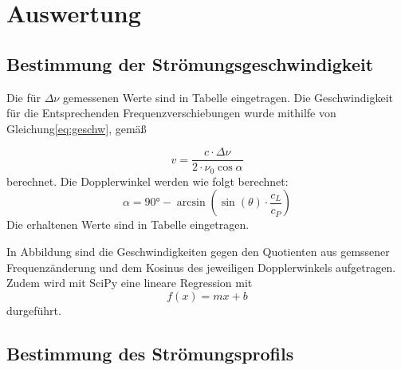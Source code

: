 \section{Auswertung}
\label{sec:Auswertung}
\subsection{Bestimmung der Strömungsgeschwindigkeit}
Die für $\Delta\nu$ gemessenen Werte sind in Tabelle eingetragen.
Die Geschwindigkeit für die Entsprechenden Frequenzverschiebungen wurde mithilfe von Gleichung\eqref{eq:geschw}, gemäß

\begin{equation}
  v= \frac{c\cdot\Delta\nu}{2\cdot\nu_0\cos{\alpha}}
\end{equation}
berechnet.
Die Dopplerwinkel werden wie folgt berechnet:
\begin{equation}
  \alpha = 90\si{\degree} - \arcsin(\sin(\theta )\cdot \frac{c_L}{c_P})
\end{equation}
Die erhaltenen Werte sind in Tabelle eingetragen.

In Abbildung sind die Geschwindigkeiten gegen den Quotienten aus gemssener Frequenzänderung und dem Kosinus des jeweiligen Dopplerwinkels aufgetragen.
Zudem wird mit SciPy eine lineare Regression mit
\begin{equation}
  f(x)= mx + b
\end{equation}
durgeführt.

\subsection{Bestimmung des Strömungsprofils}
